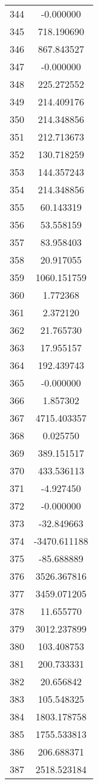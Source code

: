 \documentclass[12pt]{article}
\begin{document}
\begin{longtable}{@{}cc@{}}
344 & -0.000000 \\
345 & 718.190690 \\
346 & 867.843527 \\
347 & -0.000000 \\
348 & 225.272552 \\
349 & 214.409176 \\
350 & 214.348856 \\
351 & 212.713673 \\
352 & 130.718259 \\
353 & 144.357243 \\
354 & 214.348856 \\
355 & 60.143319 \\
356 & 53.558159 \\
357 & 83.958403 \\
358 & 20.917055 \\
359 & 1060.151759 \\
360 & 1.772368 \\
361 & 2.372120 \\
362 & 21.765730 \\
363 & 17.955157 \\
364 & 192.439743 \\
365 & -0.000000 \\
366 & 1.857302 \\
367 & 4715.403357 \\
368 & 0.025750 \\
369 & 389.151517 \\
370 & 433.536113 \\
371 & -4.927450 \\
372 & -0.000000 \\
373 & -32.849663 \\
374 & -3470.611188 \\
375 & -85.688889 \\
376 & 3526.367816 \\
377 & 3459.071205 \\
378 & 11.655770 \\
379 & 3012.237899 \\
380 & 103.408753 \\
381 & 200.733331 \\
382 & 20.656842 \\
383 & 105.548325 \\
384 & 1803.178758 \\
385 & 1755.533813 \\
386 & 206.688371 \\
387 & 2518.523184 \\

\end{longtable}
\end{document}
